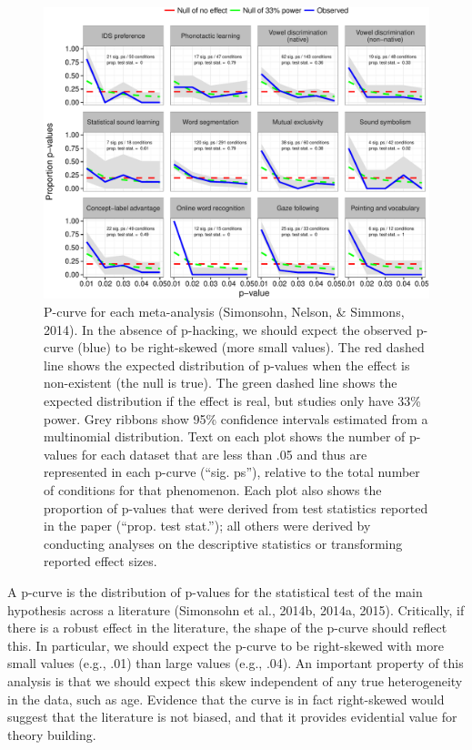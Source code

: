 \documentclass[9pt,twocolumn,twoside,lineno]{pnas-new}
\begin{document}
\begin{figure}[tbhp]
\centering
\includegraphics{figs/p_curve_plots-1.pdf}
\caption{P-curve for each meta-analysis (Simonsohn, Nelson, \& Simmons,
2014). In the absence of p-hacking, we should expect the observed
p-curve (blue) to be right-skewed (more small values). The red dashed
line shows the expected distribution of p-values when the effect is
non-existent (the null is true). The green dashed line shows the
expected distribution if the effect is real, but studies only have 33\%
power. Grey ribbons show 95\% confidence intervals estimated from a
multinomial distribution. Text on each plot shows the number of p-values
for each dataset that are less than .05 and thus are represented in each
p-curve (\enquote{sig. ps}), relative to the total number of conditions
for that phenomenon. Each plot also shows the proportion of p-values
that were derived from test statistics reported in the paper
(\enquote{prop. test stat.}); all others were derived by conducting
analyses on the descriptive statistics or transforming reported effect
sizes.}
\end{figure}

A p-curve is the distribution of p-values for the statistical test of
the main hypothesis across a literature (Simonsohn et al., 2014b, 2014a,
2015). Critically, if there is a robust effect in the literature, the
shape of the p-curve should reflect this. In particular, we should
expect the p-curve to be right-skewed with more small values (e.g., .01)
than large values (e.g., .04). An important property of this analysis is
that we should expect this skew independent of any true heterogeneity in
the data, such as age. Evidence that the curve is in fact right-skewed
would suggest that the literature is not biased, and that it provides
evidential value for theory building.
\end{document}
